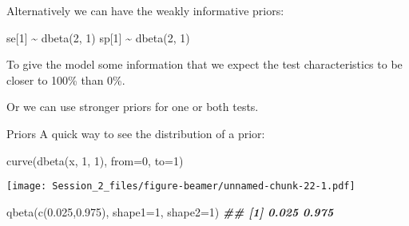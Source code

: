 \documentclass[
  ignorenonframetext,
  aspectratio=169,
]{beamer}
\newenvironment{Shaded}{\begin{snugshade}}{\end{snugshade}}
\newcommand{\AttributeTok}[1]{\textcolor[rgb]{0.77,0.63,0.00}{#1}}
\newcommand{\DecValTok}[1]{\textcolor[rgb]{0.00,0.00,0.81}{#1}}
\newcommand{\DocumentationTok}[1]{\textcolor[rgb]{0.56,0.35,0.01}{\textbf{\textit{#1}}}}
\newcommand{\FloatTok}[1]{\textcolor[rgb]{0.00,0.00,0.81}{#1}}
\newcommand{\FunctionTok}[1]{\textcolor[rgb]{0.00,0.00,0.00}{#1}}
\newcommand{\NormalTok}[1]{#1}
\newcommand{\SpecialCharTok}[1]{\textcolor[rgb]{0.00,0.00,0.00}{#1}}
\begin{document}
\begin{frame}[fragile]
Alternatively we can have the weakly informative priors:

\scriptsize

\begin{Shaded}
\begin{Highlighting}[]
\NormalTok{  se[}\DecValTok{1}\NormalTok{] }\SpecialCharTok{\textasciitilde{}} \FunctionTok{dbeta}\NormalTok{(}\DecValTok{2}\NormalTok{, }\DecValTok{1}\NormalTok{)}
\NormalTok{  sp[}\DecValTok{1}\NormalTok{] }\SpecialCharTok{\textasciitilde{}} \FunctionTok{dbeta}\NormalTok{(}\DecValTok{2}\NormalTok{, }\DecValTok{1}\NormalTok{)}
\end{Highlighting}
\end{Shaded}

\normalsize

To give the model some information that we expect the test
characteristics to be closer to 100\% than 0\%.

\pause

Or we can use stronger priors for one or both tests.
\end{frame}

\begin{frame}[fragile]{Priors}
\protect\hypertarget{priors}{}
A quick way to see the distribution of a prior:

\scriptsize

\begin{Shaded}
\begin{Highlighting}[]
\FunctionTok{curve}\NormalTok{(}\FunctionTok{dbeta}\NormalTok{(x, }\DecValTok{1}\NormalTok{, }\DecValTok{1}\NormalTok{), }\AttributeTok{from=}\DecValTok{0}\NormalTok{, }\AttributeTok{to=}\DecValTok{1}\NormalTok{)}
\end{Highlighting}
\end{Shaded}

\texttt{[image: Session\_2\_files/figure-beamer/unnamed-chunk-22-1.pdf]}

\begin{Shaded}
\begin{Highlighting}[]
\FunctionTok{qbeta}\NormalTok{(}\FunctionTok{c}\NormalTok{(}\FloatTok{0.025}\NormalTok{,}\FloatTok{0.975}\NormalTok{), }\AttributeTok{shape1=}\DecValTok{1}\NormalTok{, }\AttributeTok{shape2=}\DecValTok{1}\NormalTok{)}
\DocumentationTok{\#\# [1] 0.025 0.975}
\end{Highlighting}
\end{Shaded}

\normalsize
\end{frame}
\end{document}
